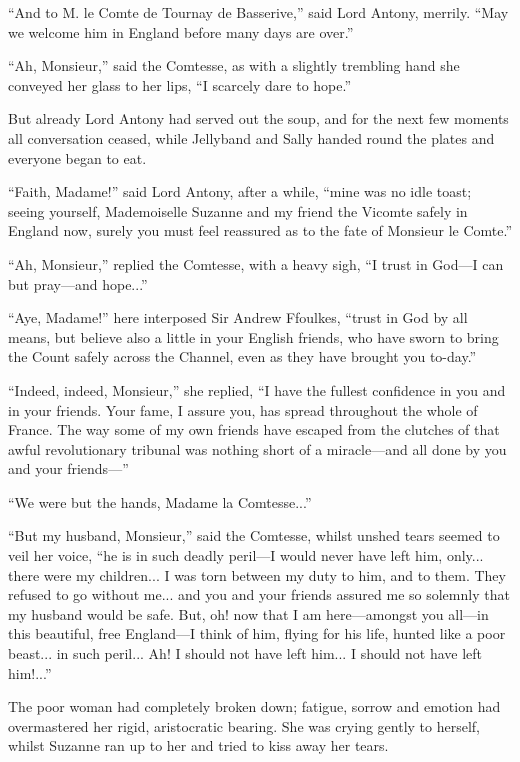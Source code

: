 \enquote{And to M. le Comte de Tournay de Basserive,} said Lord Antony, merrily. \enquote{May we welcome him in England before many days are over.}

\enquote{Ah, Monsieur,} said the Comtesse, as with a slightly trembling hand she conveyed her glass to her lips, \enquote{I scarcely dare to hope.}

But already Lord Antony had served out the soup, and for the next few moments all conversation ceased, while Jellyband and Sally handed round the plates and everyone began to eat.

\enquote{Faith, Madame!} said Lord Antony, after a while, \enquote{mine was no idle toast; seeing yourself, Mademoiselle Suzanne and my friend the Vicomte safely in England now, surely you must feel reassured as to the fate of Monsieur le Comte.}

\enquote{Ah, Monsieur,} replied the Comtesse, with a heavy sigh, \enquote{I trust in God---I can but pray---and hope...}

\enquote{Aye, Madame!} here interposed Sir Andrew Ffoulkes, \enquote{trust in God by all means, but believe also a little in your English friends, who have sworn to bring the Count safely across the Channel, even as they have brought you to-day.}

\enquote{Indeed, indeed, Monsieur,} she replied, \enquote{I have the fullest confidence in you and in your friends. Your fame, I assure you, has spread throughout the whole of France. The way some of my own friends have escaped from the clutches of that awful revolutionary tribunal was nothing short of a miracle---and all done by you and your  friends---}

\enquote{We were but the hands, Madame la Comtesse...}

\enquote{But my husband, Monsieur,} said the Comtesse, whilst unshed tears seemed to veil her voice, \enquote{he is in such deadly peril---I would never have left him, only... there were my children... I was torn between my duty to him, and to them. They refused to go without me... and you and your friends assured me so solemnly that my husband would be safe. But, oh! now that I am here---amongst you all---in this beautiful, free England---I think of him, flying for his life, hunted like a poor beast... in such peril... Ah! I should not have left him... I should not have left him!...}

The poor woman had completely broken down; fatigue, sorrow and emotion had overmastered her rigid, aristocratic bearing. She was crying gently to herself, whilst Suzanne ran up to her and tried to kiss away her tears.

